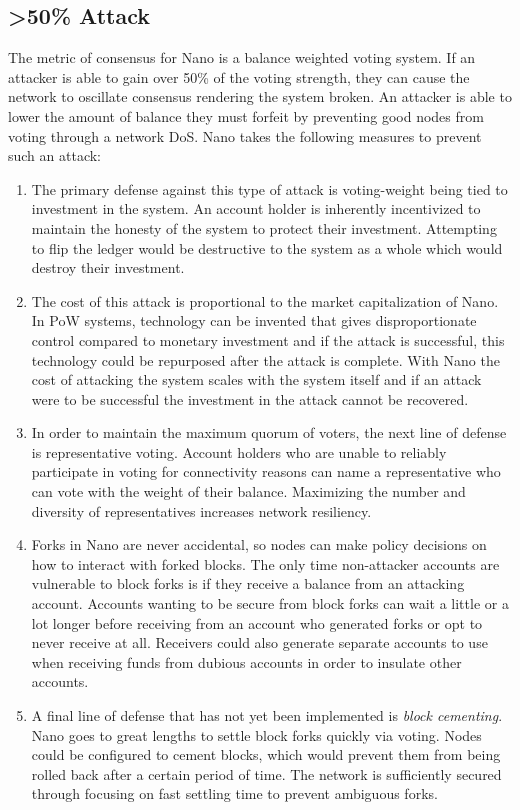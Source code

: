\subsection{\textgreater 50\% Attack} \label{sec:attack_50}
The metric of consensus for Nano is a balance weighted voting system. If an attacker is able to gain over 50\% of the voting strength, they can cause the network to oscillate consensus rendering the system broken. An attacker is able to lower the amount of balance they must forfeit by preventing good nodes from voting through a network DoS. Nano takes the following measures to prevent such an attack:
\begin{enumerate}
  \item The primary defense against this type of attack is voting-weight being tied to investment in the system. An account holder is inherently incentivized to maintain the honesty of the system to protect their investment. Attempting to flip the ledger would be destructive to the system as a whole which would destroy their investment.
  
  \item The cost of this attack is proportional to the market capitalization of Nano. In PoW systems, technology can be invented that gives disproportionate control compared to monetary investment and if the attack is successful, this technology could be repurposed after the attack is complete. With Nano the cost of attacking the system scales with the system itself and if an attack were to be successful the investment in the attack cannot be recovered.

  
  \item In order to maintain the maximum quorum of voters, the next line of defense is representative voting. Account holders who are unable to reliably participate in voting for connectivity reasons can name a representative who can vote with the weight of their balance. Maximizing the number and diversity of representatives increases network resiliency.
  
  \item Forks in Nano are never accidental, so nodes can make policy decisions on how to interact with forked blocks. The only time non-attacker accounts are vulnerable to block forks is if they receive a balance from an attacking account. Accounts wanting to be secure from block forks can wait a little or a lot longer before receiving from an account who generated forks or opt to never receive at all. Receivers could also generate separate accounts to use when receiving funds from dubious accounts in order to insulate other accounts.
  
  \item A final line of defense that has not yet been implemented is \textit{block cementing}. Nano goes to great lengths to settle block forks quickly via voting. Nodes could be configured to cement blocks, which would prevent them from being rolled back after a certain period of time. The network is sufficiently secured through focusing on fast settling time to prevent ambiguous forks.
\end{enumerate}

